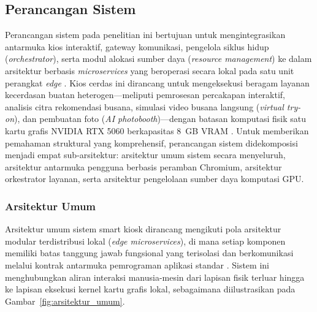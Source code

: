 
\subsection{Perancangan Sistem}
\label{subsec:perancangan_sistem}

Perancangan sistem pada penelitian ini bertujuan untuk mengintegrasikan antarmuka kios interaktif, gateway komunikasi, pengelola siklus hidup (\textit{orchestrator}), serta modul alokasi sumber daya (\textit{resource management}) ke dalam arsitektur berbasis \textit{microservices} yang beroperasi secara lokal pada satu unit perangkat \textit{edge} \cite{chen2022minideep, hossain2023role}. Kios cerdas ini dirancang untuk mengeksekusi beragam layanan kecerdasan buatan heterogen---meliputi pemrosesan percakapan interaktif, analisis citra rekomendasi busana, simulasi video busana langsung (\textit{virtual try-on}), dan pembuatan foto (\textit{AI photobooth})---dengan batasan komputasi fisik satu kartu grafis NVIDIA RTX 5060 berkapasitas 8~GB VRAM \cite{woo2025exploring}. Untuk memberikan pemahaman struktural yang komprehensif, perancangan sistem didekomposisi menjadi empat sub-arsitektur: arsitektur umum sistem secara menyeluruh, arsitektur antarmuka pengguna berbasis peramban Chromium, arsitektur orkestrator layanan, serta arsitektur pengelolaan sumber daya komputasi GPU.

\subsubsection{Arsitektur Umum}
\label{subsubsec:arsitektur_umum}

Arsitektur umum sistem smart kiosk dirancang mengikuti pola arsitektur modular terdistribusi lokal (\textit{edge microservices}), di mana setiap komponen memiliki batas tanggung jawab fungsional yang terisolasi dan berkomunikasi melalui kontrak antarmuka pemrograman aplikasi standar \cite{velepucha2023survey}. Sistem ini menghubungkan aliran interaksi manusia-mesin dari lapisan fisik terluar hingga ke lapisan eksekusi kernel kartu grafis lokal, sebagaimana diilustrasikan pada Gambar~\ref{fig:arsitektur_umum}.

